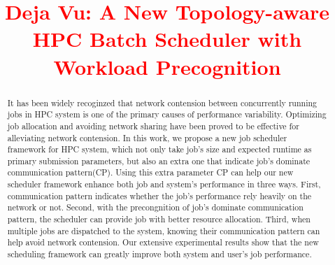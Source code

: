 \documentclass[conference]{IEEEtran}
\begin{document}
%
\title{ \textcolor{red}{Deja Vu: A New Topology-aware HPC Batch Scheduler with Workload Precognition} }
\author{


}





\maketitle


\begin{abstract} 
  
It has been widely recoginzed that network contension between concurrently running jobs in HPC system is one of the primary causes of performance variability. Optimizing job allocation and avoiding network sharing have been proved to be effective for alleviating network contension. In this work, we propose a new job scheduler framework for HPC system, which not only take job's size and expected runtime as primary submission parameters, but also an extra one that indicate job's dominate communication pattern(CP). Using this extra parameter CP can help our new scheduler framework enhance both job and system's performance in three ways. First, communication pattern indicates whether the job's performance rely heavily on the network or not. Second, with the precongnition of job's dominate communication pattern, the scheduler can provide job with better resource allocation. Third, when multiple jobs are dispatched to the system, knowing their communication pattern can help avoid network contension. Our extensive experimental results show that the new scheduling framework can greatly improve both system and user's job performance.

\end{abstract}
\end{document}
